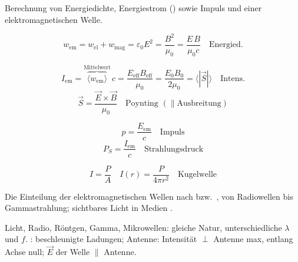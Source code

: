 \begin{runintext}
Berechnung von Energiedichte, Energiestrom () sowie Impuls und  einer elektromagnetischen Welle.
\end{runintext}
\begin{formulabox}
\[ w_{\mathrm{em}} = w_{\mathrm{el}} + w_{\mathrm{mag}} = \varepsilon_0 E^2 = \frac{B^2}{\mu_0} = \frac{E\,B}{\mu_0 c} \quad \text{Energied.} \]
\end{formulabox}

\begin{formulabox}
\[ I_{\mathrm{em}} = \overbrace{\langle w_{\mathrm{em}}\rangle}^{\text{Mittelwert}}\,c = \frac{E_{\mathrm{eff}}B_{\mathrm{eff}}}{\mu_0} = \frac{E_0 B_0}{2\mu_0} = \langle|\vec{S}|\rangle \quad \text{Intens.} \]
\[ \vec{S} = \frac{\vec{E}\times\vec{B}}{\mu_0} \quad \text{Poynting }(\parallel\text{Ausbreitung}) \]
\end{formulabox}

\begin{formulabox}
\[ p = \frac{E_{\mathrm{em}}}{c} \quad \text{Impuls} \]
\[ P_S = \frac{I_{\mathrm{em}}}{c} \quad \text{Strahlungsdruck} \]
\end{formulabox}

\begin{formulabox}
\[ I = \frac{P}{A} \quad I(r) = \frac{P}{4\pi r^2} \quad \text{Kugelwelle} \]
\end{formulabox}

\begin{runintext}
Die Einteilung der elektromagnetischen Wellen nach  bzw.\ , von Radiowellen bis Gammastrahlung; sichtbares Licht in Medien .
\end{runintext}
\begin{runintext}
Licht, Radio, Röntgen, Gamma, Mikrowellen: gleiche Natur, unterschiedliche $\lambda$ und $f$. : beschleunigte Ladungen; Antenne: Intensität $\perp$ Antenne max, entlang Achse null; $\vec{E}$ der Welle $\parallel$ Antenne.
\end{runintext}

